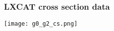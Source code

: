 \begin{frame}
	\frametitle{LXCAT cross section data}
		\centering
		\texttt{[image: g0\_g2\_cs.png]}
\end{frame}


